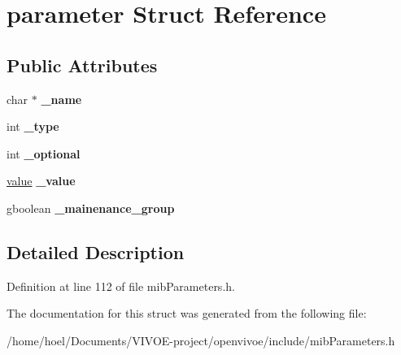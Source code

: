 \hypertarget{structparameter}{}\section{parameter Struct Reference}
\label{structparameter}
\subsection*{Public Attributes}
\begin{DoxyCompactItemize}
\item 
char $\ast$ {\bfseries \+\_\+name}\hypertarget{structparameter_a7efc40bf4202e99bb1678aa45c31824e}{}\label{structparameter_a7efc40bf4202e99bb1678aa45c31824e}

\item 
int {\bfseries \+\_\+type}\hypertarget{structparameter_a5608c8ef44f3ab70bb1404eb4226ec8e}{}\label{structparameter_a5608c8ef44f3ab70bb1404eb4226ec8e}

\item 
int {\bfseries \+\_\+optional}\hypertarget{structparameter_ad26e4d6f92620b952ff072e34c2f4736}{}\label{structparameter_ad26e4d6f92620b952ff072e34c2f4736}

\item 
\hyperlink{unionvalue}{value} {\bfseries \+\_\+value}\hypertarget{structparameter_aca0f66ea0b3b24691d7a4c271354472e}{}\label{structparameter_aca0f66ea0b3b24691d7a4c271354472e}

\item 
gboolean {\bfseries \+\_\+mainenance\+\_\+group}\hypertarget{structparameter_a16dfa946f8c3865ed2d1c72f84445caa}{}\label{structparameter_a16dfa946f8c3865ed2d1c72f84445caa}

\end{DoxyCompactItemize}


\subsection{Detailed Description}


Definition at line 112 of file mib\+Parameters.\+h.



The documentation for this struct was generated from the following file\+:\begin{DoxyCompactItemize}
\item 
/home/hoel/\+Documents/\+V\+I\+V\+O\+E-\/project/openvivoe/include/mib\+Parameters.\+h\end{DoxyCompactItemize}
